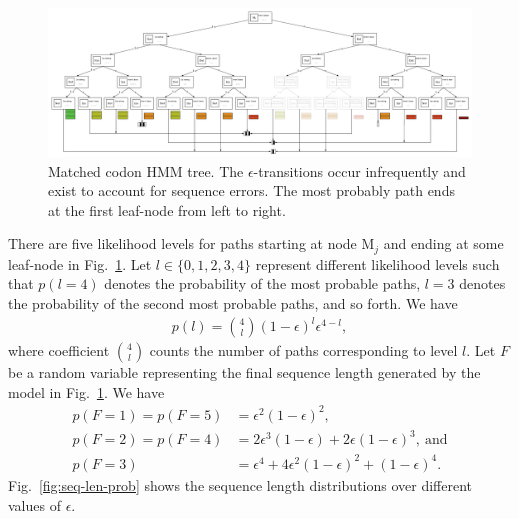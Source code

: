 \documentclass[a4paper]{article}
\theoremstyle{definition}
\theoremstyle{definition}
\newcommand{\eps}{\epsilon}
\begin{document}
\begin{figure}
    \centering
    \includegraphics[scale=0.9]{codon-hmm-tree}
    \caption{Matched codon HMM tree.
        The $\eps$-transitions occur infrequently and exist to account for sequence errors.
        The most probably path ends at the first leaf-node from left to right.}\label{fig:codon-hmm-tree}
\end{figure}

There are five likelihood levels for paths starting at node $\mathrm M_j$ and ending at some leaf-node in Fig.~\ref{fig:codon-hmm-tree}.
Let $l\in\{0, 1, 2, 3, 4\}$ represent different likelihood levels such that $p(l=4)$ denotes the probability of
the most probable paths, $l=3$ denotes the probability of the second most probable paths, and so forth.
We have
\begin{align*}
    p(l) = \binom{4}{l} (1 - \eps)^{l}\eps^{4-l},
\end{align*}
where coefficient $\binom{4}{l}$ counts the number of paths corresponding to level $l$.
Let $F$ be a random variable representing the final sequence length generated by the model in
Fig.~\ref{fig:codon-hmm-tree}.
We have
\begin{align*}
    p(F=1) = p(F=5) &= \eps^2(1-\eps)^2, \\
    p(F=2) = p(F=4) &= 2\eps^3(1-\eps) + 2\eps(1-\eps)^3,~\text{and} \\
    p(F=3)          &= \eps^4 + 4\eps^2(1-\eps)^2 + (1-\eps)^4.
\end{align*}
Fig.~\ref{fig:seq-len-prob} shows the sequence length distributions over different values of $\eps$.
\end{document}
